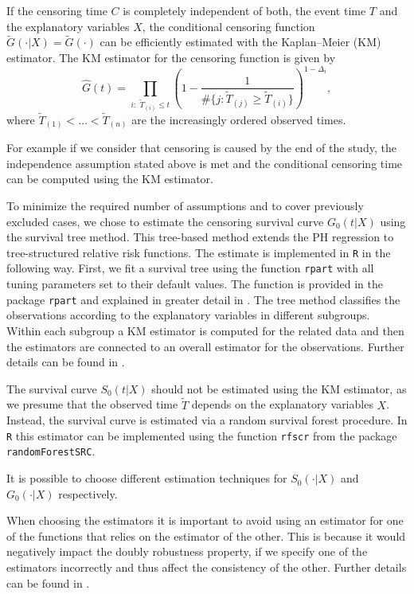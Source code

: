 \documentclass[12pt, a4paper]{scrartcl}
\theoremstyle{definition}
\theoremstyle{plain}
\numberwithin{equation}{section}
\numberwithin{figure}{section}
\numberwithin{table}{section}
\begin{document}
	If the censoring time $C$ is completely independent of both, the event time $T$ and the explanatory variables $X$, the conditional censoring function $\tilde{G}(\cdot\vert X)=\tilde{G}(\cdot)$ can be efficiently estimated with the Kaplan--Meier (KM) estimator.
	The KM estimator for the censoring function is given by
	\begin{equation*}
		\hat{G}(t) = \prod_{i:\text{~} \tilde T_{(i)} \leq t} \left(1-\frac{1}{\#\{j: \tilde T_{(j)} \geq\tilde T_{(i)} \}}\right)^{1-\Delta_i},
	\end{equation*}
	where $\tilde T_{(1)}<\dots<\tilde T_{(n)}$ are the increasingly ordered observed times.
	
	For example if we consider that censoring is caused by the end of the study, the independence assumption stated above is met and the conditional censoring time can be computed using the KM estimator.
	
	To minimize the required number of assumptions and to cover previously excluded cases, we chose to estimate the censoring survival curve $G_0(t \vert X)$ using the survival tree method.
	This tree-based method extends the PH regression to tree-structured relative risk functions.
	The estimate is implemented in \texttt{R} in the following way.
	First, we fit a survival tree using the function \texttt{rpart} with all tuning parameters set to their default values.
	The function is provided in the package \texttt{rpart} and explained in greater detail in \citet*{rpart}.
	The tree method classifies the observations according to the explanatory variables in different subgroups.
	Within each subgroup a KM estimator is computed for the related data and then the estimators are connected to an overall estimator for the observations. %
	Further details can be found in \citet*{relativerisktrees}.
	
	The survival curve $S_0(t\vert X)$ should not be estimated using the KM estimator, as we presume that the observed time $\tilde T$ depends on the explanatory variables $X$.
	Instead, the survival curve is estimated via a random survival forest procedure.
	In \texttt{R} this estimator can be implemented using the function \texttt{rfscr} from the package \texttt{randomForestSRC}. 
	
	It is possible to choose different estimation techniques for $S_0(\cdot\vert X)$ and $G_0(\cdot\vert X)$ respectively.
	
	When choosing the estimators it is important to avoid using an estimator for one of the functions that relies on the estimator of the other.
	This is because it would negatively impact the doubly robustness property, if we specify one of the estimators incorrectly and thus affect the consistency of the other.
	Further details can be found in \citet*{drtrees}.
	
\end{document}
